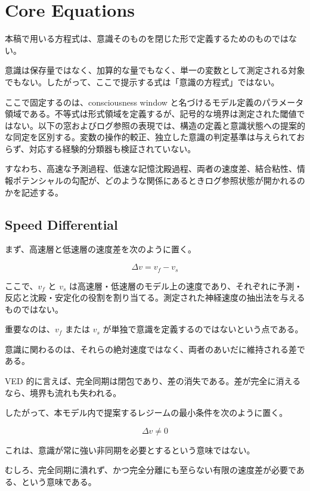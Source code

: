 \section{Core Equations}


本稿で用いる方程式は、意識そのものを閉じた形で定義するためのものではない。

意識は保存量ではなく、加算的な量でもなく、単一の変数として測定される対象でもない。したがって、ここで提示する式は「意識の方程式」ではない。

ここで固定するのは、consciousness window と名づけるモデル定義のパラメータ領域である。不等式は形式領域を定義するが、記号的な境界は測定された閾値ではない。以下の窓およびログ参照の表現では、構造の定義と意識状態への提案的な同定を区別する。変数の操作的較正、独立した意識の判定基準は与えられておらず、対応する経験的分類器も検証されていない。

すなわち、高速な予測過程、低速な記憶沈殿過程、両者の速度差、結合粘性、情報ポテンシャルの勾配が、どのような関係にあるときログ参照状態が開かれるのかを記述する。

\subsection{Speed Differential}

まず、高速層と低速層の速度差を次のように置く。

\begin{equation}
\Delta v = v_f - v_s
\end{equation}

ここで、$v_f$ と $v_s$ は高速層・低速層のモデル上の速度であり、それぞれに予測・反応と沈殿・安定化の役割を割り当てる。測定された神経速度の抽出法を与えるものではない。

重要なのは、$v_f$ または $v_s$ が単独で意識を定義するのではないという点である。

意識に関わるのは、それらの絶対速度ではなく、両者のあいだに維持される差である。

VED 的に言えば、完全同期は閉包であり、差の消失である。差が完全に消えるなら、境界も流れも失われる。

したがって、本モデル内で提案するレジームの最小条件を次のように置く。

\begin{equation}
\Delta v \neq 0
\end{equation}

これは、意識が常に強い非同期を必要とするという意味ではない。

むしろ、完全同期に潰れず、かつ完全分離にも至らない有限の速度差が必要である、という意味である。

